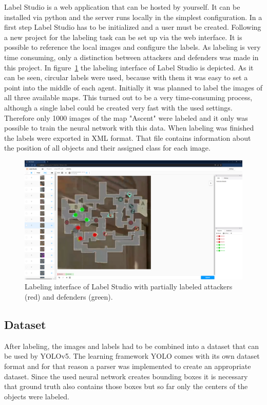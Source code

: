 Label Studio is a web application that can be hosted by yourself. It can be installed via python and 
the server runs locally in the simplest configuration. In a first step Label Studio has to be initialized 
and a user must be created. Following a new project for the labeling task can be set up via the web 
interface. It is possible to reference the local images and configure the labels. As labeling is very 
time consuming, only a distinction between attackers and defenders was made in this project. In 
figure~\ref{fig:app:labelstudio} the labeling interface of Label Studio is depicted. As it can be seen,  
circular labels were used, because with them it was easy to set a point into the middle of each 
agent. Initially it was planned to label the images of all three available maps. This turned out to be a 
very time-consuming process, although a single label could be created very fast with the used 
settings. Therefore only 1000 images of the map "Ascent" were labeled and it only was possible to 
train the neural network with this data. When labeling was finished the labels were exported in XML 
format. That file contains information about the position of all objects and their assigned class for 
each image.

\begin{figure}
	\centering
	\includegraphics[width=0.95\linewidth]{images/07-labelstudio}
	\caption[Interface of Label Studio.]{Labeling interface of Label Studio with partially labeled 
	attackers (red) and defenders (green).}
	\label{fig:app:labelstudio}
\end{figure}

\subsection{Dataset}\label{subsec:app:dataset}

After labeling, the images and labels had to be combined into a dataset that can be used by 
YOLOv5. The learning framework YOLO comes with its own dataset format and for that reason a 
parser was implemented to create an appropriate dataset. Since the used neural network creates 
bounding boxes it is necessary that ground truth also contains those boxes but so far only the 
centers of the objects were labeled. 

